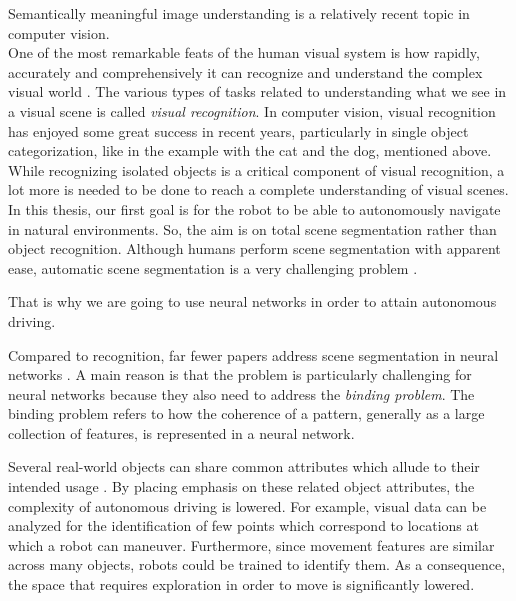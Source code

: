 \documentclass[12pt,a4paper]{report}
\newcommand{\term}{\textit}
\begin{document}
	
	
	
	Semantically meaningful image understanding is a relatively recent topic in computer vision.
	\\
	
	
	One of the most remarkable feats of the human visual system is how rapidly, 
	accurately and comprehensively it can recognize and understand the complex visual 
	world \citep{Socher}. The various types of tasks related to understanding what 
	we see in a visual scene is called \term{visual recognition}. In computer vision, 
	visual recognition has enjoyed some great success in recent years, particularly 
	in single object categorization, like in the example with the cat and the dog, 
	mentioned above. While recognizing isolated objects is a critical component of 
	visual recognition, a lot more is needed to be done to reach a complete 
	understanding of visual scenes.
	\\
	
	
	In this thesis, our first goal is for the robot to be able to autonomously 
	navigate in natural environments. So, the aim is on total scene segmentation 
	rather than object recognition. Although humans perform scene segmentation with 
	apparent ease, automatic scene segmentation is a very challenging problem 
	\citep{Wang}. 
	\par
	That is why we are going to use neural networks in order to attain 
	autonomous driving. 
	\par
	Compared to recognition, far fewer papers address scene segmentation in neural 
	networks \cite{Wang}. A main reason is that the problem is particularly 
	challenging for neural networks because they also need to address the \term{binding 
	problem}. The binding problem refers to how the coherence of a pattern, generally 
	as a large collection of features, is represented in a neural network. 
	\par
	Several real-world objects can share common attributes which allude to their 
	intended usage \citep{Shabbir}. By placing emphasis on these related object 
	attributes, the complexity of autonomous driving is lowered. For example, visual 
	data can be analyzed for the identification of few points which correspond to 
	locations at which a robot can maneuver. Furthermore, since movement features 
	are similar across many objects, robots could be trained to identify them. As a 
	consequence, the space that requires exploration in order to move is 
	significantly lowered.
	\\
	
\end{document}
